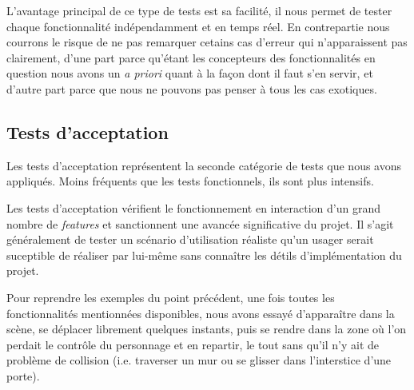 L'avantage principal de ce type de tests est sa facilité, il nous permet de tester chaque fonctionnalité indépendamment et en temps réel. En contrepartie nous courrons le risque de ne pas remarquer cetains cas d'erreur qui n'apparaissent pas clairement, d'une part parce qu'étant les concepteurs des fonctionnalités en question nous avons un \textit{a priori} quant à la façon dont il faut s'en servir, et d'autre part parce que nous ne pouvons pas penser à tous les cas exotiques.

\subsection{Tests d'acceptation}
Les tests d'acceptation représentent la seconde catégorie de tests que nous avons appliqués. Moins fréquents que les tests fonctionnels, ils sont plus intensifs. \newline

Les tests d'acceptation vérifient le fonctionnement en interaction d'un grand nombre de \textit{features} et sanctionnent une avancée significative du projet. Il s'agit généralement de tester un scénario d'utilisation réaliste qu'un usager serait suceptible de réaliser par lui-même sans connaître les détils d'implémentation du projet. \newline

Pour reprendre les exemples du point précédent, une fois toutes les fonctionnalités mentionnées disponibles, nous avons essayé d'apparaître dans la scène, se déplacer librement quelques instants, puis se rendre dans la zone où l'on perdait le contrôle du personnage et en repartir, le tout sans qu'il n'y ait de problème de collision (i.e. traverser un mur ou se glisser dans l'interstice d'une porte). 
